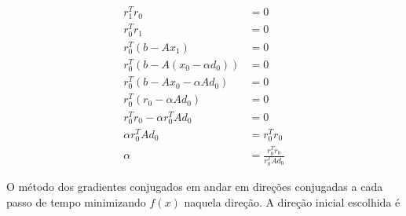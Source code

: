 \begin{align}
     r_1^T r_0                         & =  0 \\
     r_0^T r_1                         & =  0 \\
     r_0^T (b - Ax_1)                  & =  0 \\
     r_0^T (b - A(x_0 - \alpha d_0))   & =  0 \\
     r_0^T (b - Ax_0  - \alpha A d_0)  & =  0 \\
     r_0^T (r_0 - \alpha A d_0)        & =  0 \\
     r_0^T r_0 - \alpha  r_0^T A d_0   & =  0 \\
     \alpha  r_0^T A d_0               & =  r_0^T r_0 \\
     \alpha                            & =  \frac{r_0^T r_0}{r_0^T Ad_0} 
\end{align}
                                                                           
O método dos gradientes conjugados em andar em direções conjugadas a cada passo de tempo minimizando $f(x)$ naquela direção. A direção inicial escolhida é 